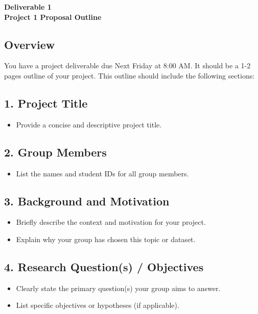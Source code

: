 \documentclass[12pt]{article}
\begin{document}
\begin{center}
\textbf{\Large Deliverable 1 \\ Project 1 Proposal Outline} 
\end{center}

\subsection*{Overview}
You have a project deliverable due Next Friday at 8:00 AM. It should be a 1-2 pages outline of your project.
This outline should include the following sections:


\subsection*{1. Project Title}
\begin{itemize}
    \item Provide a concise and descriptive project title.
\end{itemize}

\subsection*{2. Group Members}
\begin{itemize}
    \item List the names and student IDs for all group members.
\end{itemize}

\subsection*{3. Background and Motivation}
\begin{itemize}
    \item Briefly describe the context and motivation for your project.
    \item Explain why your group has chosen this topic or dataset.
\end{itemize}

\subsection*{4. Research Question(s) / Objectives}
\begin{itemize}
    \item Clearly state the primary question(s) your group aims to answer.
    \item List specific objectives or hypotheses (if applicable).
\end{itemize}
\end{document}
